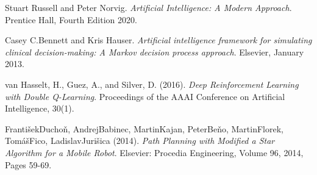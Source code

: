 \documentclass[10pt,a4paper,twocolumn]{article}
\begin{document}
	
	\begin{thebibliography}{9}
		Stuart Russell and Peter Norvig. 
		\textit{Artificial Intelligence: A Modern Approach}. 
		Prentice Hall, Fourth Edition 2020.
		
		Casey C.Bennett and Kris Hauser. 
		\textit{Artificial intelligence framework for simulating clinical decision-making: A Markov decision process approach}. 
		Elsevier, January 2013.
		
		van Hasselt, H., Guez, A., and Silver, D. (2016). 
		\textit{Deep Reinforcement Learning with Double Q-Learning}. 
		Proceedings of the AAAI Conference on Artificial Intelligence, 30(1). 
		
		FrantišekDuchoň, AndrejBabinec, MartinKajan, PeterBeňo, MartinFlorek, TomášFico, LadislavJurišica (2014). 
		\textit{Path Planning with Modified a Star Algorithm for a Mobile Robot}. 
		Elsevier: Procedia Engineering, Volume 96, 2014, Pages 59-69. 

	\end{thebibliography}
	
\end{document}
